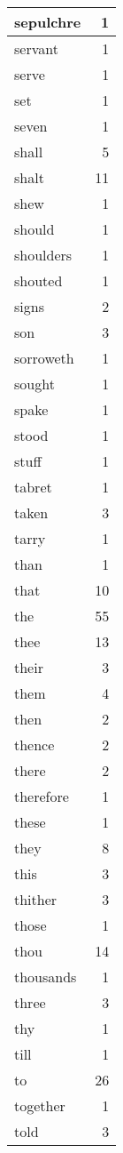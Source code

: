 \begin{center}
\begin{longtable}{l|r}
sepulchre & 1 \\ \hline
servant & 1 \\ \hline
serve & 1 \\ \hline
set & 1 \\ \hline
seven & 1 \\ \hline
shall & 5 \\ \hline
shalt & 11 \\ \hline
shew & 1 \\ \hline
should & 1 \\ \hline
shoulders & 1 \\ \hline
shouted & 1 \\ \hline
signs & 2 \\ \hline
son & 3 \\ \hline
sorroweth & 1 \\ \hline
sought & 1 \\ \hline
spake & 1 \\ \hline
stood & 1 \\ \hline
stuff & 1 \\ \hline
tabret & 1 \\ \hline
taken & 3 \\ \hline
tarry & 1 \\ \hline
than & 1 \\ \hline
that & 10 \\ \hline
the & 55 \\ \hline
thee & 13 \\ \hline
their & 3 \\ \hline
them & 4 \\ \hline
then & 2 \\ \hline
thence & 2 \\ \hline
there & 2 \\ \hline
therefore & 1 \\ \hline
these & 1 \\ \hline
they & 8 \\ \hline
this & 3 \\ \hline
thither & 3 \\ \hline
those & 1 \\ \hline
thou & 14 \\ \hline
thousands & 1 \\ \hline
three & 3 \\ \hline
thy & 1 \\ \hline
till & 1 \\ \hline
to & 26 \\ \hline
together & 1 \\ \hline
told & 3 \\ \hline

\end{longtable}
\end{center}
